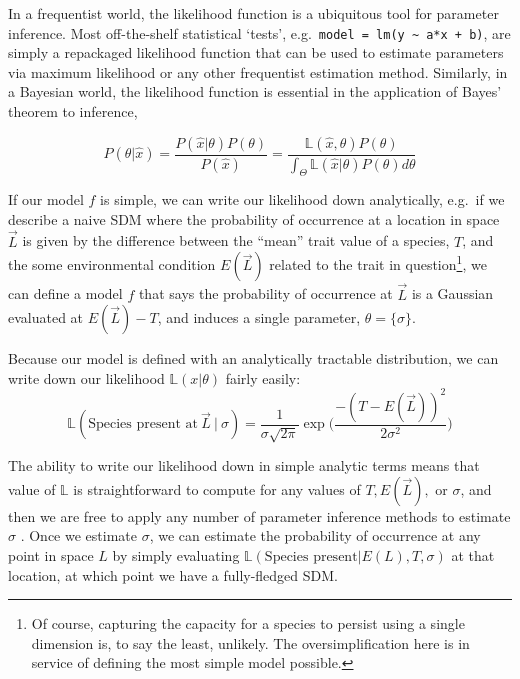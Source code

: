 In a frequentist world, the likelihood function is a ubiquitous tool for
parameter inference. Most off-the-shelf statistical `tests',
e.g.~\texttt{model\ =\ lm(y\ \textasciitilde{}\ a*x\ +\ b)}, are simply
a repackaged likelihood function that can be used to estimate parameters
via maximum likelihood or any other frequentist estimation method.
Similarly, in a Bayesian world, the likelihood function is essential in
the application of Bayes' theorem to inference,

\[ P(\theta | \hat{x}) = \frac{P(\hat{x} | \theta)  P(\theta)}{P(\hat{x})} = \frac{\mathbb{L}(\hat{x}, \theta)  P(\theta)}{\int_\Theta \mathbb{L}(\hat{x} | \theta) P(\theta) d\theta}\]

If our model \(f\) is simple, we can write our likelihood down
analytically, e.g.~if we describe a naive SDM where the probability of
occurrence at a location in space \(\vec{L}\) is given by the difference
between the ``mean'' trait value of a species, \(T\), and the some
environmental condition \(E(\vec{L})\) related to the trait in
question\footnote{Of course, capturing the capacity for a species to
  persist using a single dimension is, to say the least, unlikely. The
  oversimplification here is in service of defining the most simple
  model possible.}, we can define a model \(f\) that says the
probability of occurrence at \(\vec{L}\) is a Gaussian evaluated at
\(E(\vec{L}) - T\), and induces a single parameter,
\(\theta = \{ \sigma \}\).

Because our model is defined with an analytically tractable
distribution, we can write down our likelihood
\(\mathbb{L}(x | \theta)\) fairly easily:
\[\mathbb{L}(\text{Species present at} \ \vec{L} \ |\  \sigma) = \frac{1}{\sigma \sqrt{2\pi}} \exp \Big( \frac{-(T-E(\vec{L}))^2}{2\sigma^2} \Big)\]

The ability to write our likelihood down in simple analytic terms means
that value of \(\mathbb{L}\) is straightforward to compute for any
values of \(T, E(\vec{L}),\) or \(\sigma\), and then we are free to
apply any number of parameter inference methods to estimate \(\sigma\) .
Once we estimate \(\sigma\), we can estimate the probability of
occurrence at any point in space \(L\) by simply evaluating
\(\mathbb{L}(\text{Species present} | E(L) , T, \sigma)\) at that
location, at which point we have a fully-fledged SDM.

